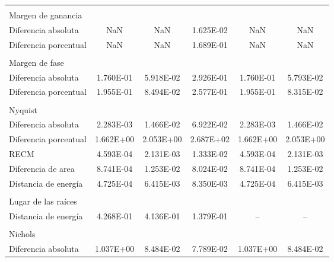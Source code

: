 {\begin{longtable}{l @{\extracolsep{\fill}} ccccc}
            & & & & & \\
            Margen de ganancia     &  &  &  &  & \\ \cmidrule{1-1}
            Diferencia absoluta    &        NaN      &       NaN       & \num{1.625E-02} &       NaN       &        NaN       \\
            Diferencia porcentual  &        NaN      &       NaN       & \num{1.689E-01} &       NaN       &        NaN       \\
            & & & & & \\
            Margen de fase         &  &  &  &  & \\ \cmidrule{1-1}
            Diferencia absoluta    & \num{1.760E-01} & \num{5.918E-02} & \num{2.926E-01} & \num{1.760E-01} & \num{5.793E-02}  \\
            Diferencia porcentual  & \num{1.955E-01} & \num{8.494E-02} & \num{2.577E-01} & \num{1.955E-01} & \num{8.315E-02}  \\
            & & & & & \\
            Nyquist                &  &  &  &  & \\ \cmidrule{1-1}
            Diferencia absoluta    & \num{2.283E-03} & \num{1.466E-02} & \num{6.922E-02} & \num{2.283E-03} & \num{1.466E-02}  \\
            Diferencia porcentual  & \num{1.662E+00} & \num{2.053E+00} & \num{2.687E+02} & \num{1.662E+00} & \num{2.053E+00}  \\
            RECM                   & \num{4.593E-04} & \num{2.131E-03} & \num{1.333E-02} & \num{4.593E-04} & \num{2.131E-03}  \\
            Diferencia de area     & \num{8.741E-04} & \num{1.253E-02} & \num{8.024E-02} & \num{8.741E-04} & \num{1.253E-02}  \\
            Distancia de energía   & \num{4.725E-04} & \num{6.415E-03} & \num{8.350E-03} & \num{4.725E-04} & \num{6.415E-03}  \\
            & & & & & \\
            Lugar de las raíces    &  &  &  &  & \\ \cmidrule{1-1}
            Distancia de energía   & \num{4.268E-01} & \num{4.136E-01} & \num{1.379E-01} & -- & --  \\
            & & & & & \\
            Nichols                &  &  &  &  & \\ \cmidrule{1-1}
            Diferencia absoluta    & \num{1.037E+00} & \num{8.484E-02} & \num{7.789E-02} & \num{1.037E+00} & \num{8.484E-02}  \\

\end{longtable}}
